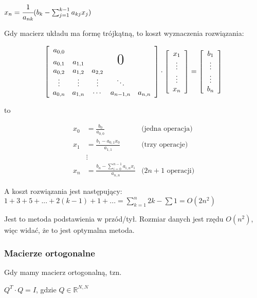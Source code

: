 \documentclass[hidelinks,a4paper]{article}
\newcommand{\RR}{\mathbb{R}}
\begin{document}
$x_n = \cfrac{1}{a_{nk}}(b_k - \sum_{j=1}^{k-1} a_{kj}x_j)$

Gdy macierz układu ma formę trójkątną, to koszt wyznaczenia rozwiązania:

\[
	\left[
		\begin{array}{ccccc}
			a_{0,0} \\
			a_{0,1} & a_{1,1}  &   & \text{\huge0}\\
			a_{0,2}  & a_{1,2} & a_{2,2} \\
			\vdots  & \vdots & \vdots & \ddots \\
			a_{0,n} & a_{1,n} & \cdots & a_{n-1,n} & a_{n,n} 
		\end{array}
	\right]
	\cdot
	\left [
		\begin{array}{c}
			x_1 \\  \vdots \\  \vdots \\ x_n
		\end{array}
	\right]
	=
	\left [
		\begin{array}{c}
			b_1 \\ \vdots \\ \vdots \\ b_n
		\end{array}
	\right]
\]

to

\begin{align*}
	x_0 & = \frac{b_0}{a_{0,0}}                                & \text{(jedna operacja)}    \\
	x_1 & = \frac{b_1 - a_{0,1} x_0}{a_{1,1}}                  & \text{(trzy operacje)}     \\
	&\vdots \\
	x_n & = \frac{b_n - \sum_{i=0}^{n-1} a_{i,n} x_i}{a_{n,n}} & \text{($2n + 1$ operacji)} 
\end{align*}

A koszt rozwiązania jest następujący:
$1+3+5+...+2(k-1)+1+... = \sum_{k=1}^{n} 2k - \sum 1 = O(2n^2)$

Jest to metoda podstawienia w przód/tył. Rozmiar danych jest rzędu $O(n^2)$, więc widać, że to jest optymalna metoda.

\subsubsection{Macierze ortogonalne}

Gdy mamy macierz ortogonalną, tzn.

$Q^T \cdot Q = I$, gdzie $Q \in \RR^{N, N}$
\end{document}
